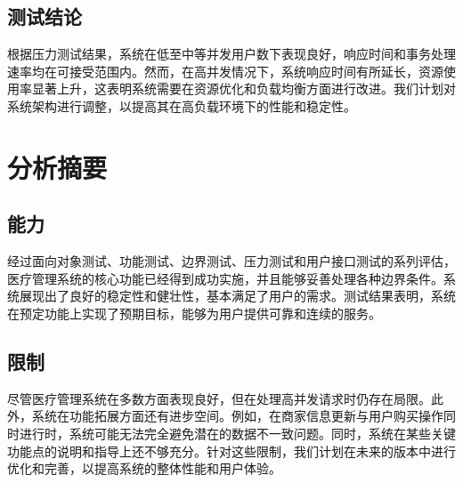 \subsection{测试结论}
根据压力测试结果，系统在低至中等并发用户数下表现良好，响应时间和事务处理速率均在可接受范围内。然而，在高并发情况下，系统响应时间有所延长，资源使用率显著上升，这表明系统需要在资源优化和负载均衡方面进行改进。我们计划对系统架构进行调整，以提高其在高负载环境下的性能和稳定性。
\section{分析摘要}

\subsection{能力}
经过面向对象测试、功能测试、边界测试、压力测试和用户接口测试的系列评估，医疗管理系统的核心功能已经得到成功实施，并且能够妥善处理各种边界条件。系统展现出了良好的稳定性和健壮性，基本满足了用户的需求。测试结果表明，系统在预定功能上实现了预期目标，能够为用户提供可靠和连续的服务。

\subsection{限制}
尽管医疗管理系统在多数方面表现良好，但在处理高并发请求时仍存在局限。此外，系统在功能拓展方面还有进步空间。例如，在商家信息更新与用户购买操作同时进行时，系统可能无法完全避免潜在的数据不一致问题。同时，系统在某些关键功能点的说明和指导上还不够充分。针对这些限制，我们计划在未来的版本中进行优化和完善，以提高系统的整体性能和用户体验。